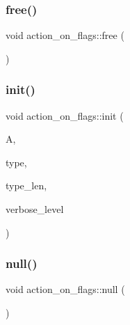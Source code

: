 \mbox{\label{classaction__on__flags_abf9fe3d87034e76fe685ea45ea280133}} 
\subsubsection{\texorpdfstring{free()}{free()}}
{\footnotesize\ttfamily void action\+\_\+on\+\_\+flags\+::free (\begin{DoxyParamCaption}{ }\end{DoxyParamCaption})}

\mbox{\label{classaction__on__flags_aad56abe238e588bdc368c6396d3813dc}} 
\subsubsection{\texorpdfstring{init()}{init()}}
{\footnotesize\ttfamily void action\+\_\+on\+\_\+flags\+::init (\begin{DoxyParamCaption}\item[{\mbox{\hyperlink{classaction}{action}} $\ast$}]{A,  }\item[{\mbox{\hyperlink{galois_8h_a09fddde158a3a20bd2dcadb609de11dc}{I\+NT}} $\ast$}]{type,  }\item[{\mbox{\hyperlink{galois_8h_a09fddde158a3a20bd2dcadb609de11dc}{I\+NT}}}]{type\+\_\+len,  }\item[{\mbox{\hyperlink{galois_8h_a09fddde158a3a20bd2dcadb609de11dc}{I\+NT}}}]{verbose\+\_\+level }\end{DoxyParamCaption})}

\mbox{\label{classaction__on__flags_ac2894bc8c10e10e1c1ac784a8f7e0d03}} 
\subsubsection{\texorpdfstring{null()}{null()}}
{\footnotesize\ttfamily void action\+\_\+on\+\_\+flags\+::null (\begin{DoxyParamCaption}{ }\end{DoxyParamCaption})}



